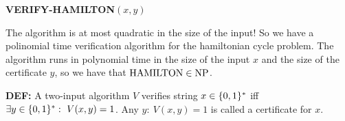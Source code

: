 \begin{notesalgorithm}
\textbf{VERIFY-HAMILTON$(x,y)$}
\begin{notespseudocode}
\end{notespseudocode}
\end{notesalgorithm}

The algorithm is at most quadratic in the size of the input! So we have a polinomial time verification algorithm for the hamiltonian cycle problem. The algorithm runs in polynomial time in the size of the input $x$ and the size of the certificate $y$, so we have that $\mathrm{HAMILTON}\in\mathrm{NP}$.

\begin{notesdefinition}
\textbf{DEF:} A two-input algorithm $V$ verifies string $x\in\{0,1\}^*$ iff $\exists y\in\{0,1\}^*:\ V(x,y)=1$.
Any $y:\ V(x,y)=1$ is called a certificate for $x$.
\end{notesdefinition}
